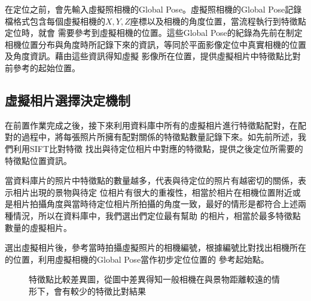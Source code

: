 
	在定位之前，會先輸入虛擬照相機的Global Pose。虛擬照相機的Global Pose記錄檔格式包含每個虛擬相機的$X,Y,Z$座標以及相機的角度位置，當流程執行到特徵點定位時，就會
	需要參考到虛擬相機的位置。這些Global Pose的紀錄為先前在制定相機位置分布與角度時所記錄下來的資訊，等同於平面影像定位中真實相機的位置及角度資訊。藉由這些資訊得知虛擬
	影像所在位置，提供虛擬相片中特徵點比對前參考的起始位置。
		
\subsection{虛擬相片選擇決定機制}	

	在前置作業完成之後，接下來利用資料庫中所有的虛擬相片進行特徵點配對，在配對的過程中，將每張照片所擁有配對關係的特徵點數量記錄下來。如先前所述，我們利用SIFT比對特徵
	找出與待定位相片中對應的特徵點，提供之後定位所需要的特徵點位置資訊。
	
	當資料庫片的照片中特徵點的數量越多，代表與待定位的照片有越密切的關係，表示相片出現的景物與待定
	位相片有很大的重複性，相當於相片在相機位置附近或是相片拍攝角度與當時待定位相片所拍攝的角度一致，最好的情形是都符合上述兩種情況，所以在資料庫中，我們選出們定位最有幫助
	的相片，相當於最多特徵點數量的虛擬相片。
	
	選出虛擬相片後，參考當時拍攝虛擬照片的相機編號，根據編號比對找出相機所在的位置，利用虛擬相機的Global Pose當作初步定位位置的
	參考起始點。
	
	\begin{figure}
    	\begin{center}
    	\end{center}
    	\caption{特徵點比較差異圖，從圖中差異得知一般相機在與景物距離較遠的情形下，會有較少的特徵比對結果}
    	\label{fig:SIFT_Descriptor_Match}
    \end{figure}
	
